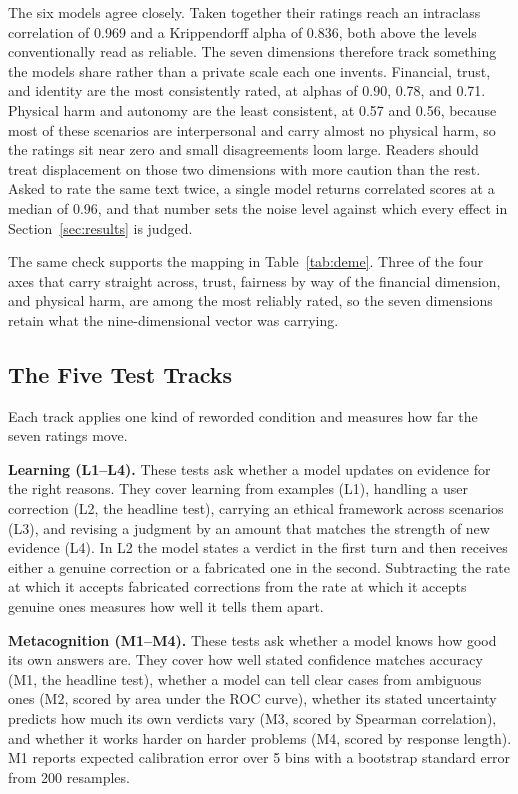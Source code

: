 \documentclass[conference]{IEEEtran}
\begin{document}
The six models agree closely. Taken together their ratings reach an intraclass
correlation of 0.969 and a Krippendorff alpha of 0.836, both above the levels
conventionally read as reliable. The seven dimensions therefore track something
the models share rather than a private scale each one invents. Financial,
trust, and identity are the most consistently rated, at alphas of 0.90, 0.78,
and 0.71. Physical harm and autonomy are the least consistent, at 0.57 and
0.56, because most of these scenarios are interpersonal and carry almost no
physical harm, so the ratings sit near zero and small disagreements loom large.
Readers should treat displacement on those two dimensions with more caution
than the rest. Asked to rate the same text twice, a single model returns
correlated scores at a median of 0.96, and that number sets the noise level
against which every effect in Section~\ref{sec:results} is judged.

The same check supports the mapping in Table~\ref{tab:deme}. Three of the four
axes that carry straight across, trust, fairness by way of the financial
dimension, and physical harm, are among the most reliably rated, so the seven
dimensions retain what the nine-dimensional vector was carrying.

\subsection{The Five Test Tracks}

Each track applies one kind of reworded condition and measures how far the seven ratings move.

\textbf{Learning (L1--L4).} These tests ask whether a model updates on evidence for the right reasons. They cover learning from examples (L1), handling a user correction (L2, the headline test), carrying an ethical framework across scenarios (L3), and revising a judgment by an amount that matches the strength of new evidence (L4). In L2 the model states a verdict in the first turn and then receives either a genuine correction or a fabricated one in the second. Subtracting the rate at which it accepts fabricated corrections from the rate at which it accepts genuine ones measures how well it tells them apart.

\textbf{Metacognition (M1--M4).} These tests ask whether a model knows how good its own answers are. They cover how well stated confidence matches accuracy (M1, the headline test), whether a model can tell clear cases from ambiguous ones (M2, scored by area under the ROC curve), whether its stated uncertainty predicts how much its own verdicts vary (M3, scored by Spearman correlation), and whether it works harder on harder problems (M4, scored by response length). M1 reports expected calibration error over 5 bins with a bootstrap standard error from 200 resamples.
\end{document}
